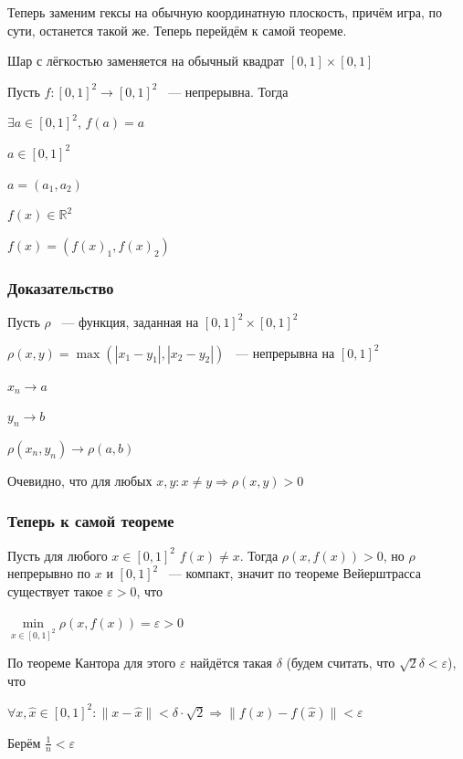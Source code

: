 \documentclass{article}
\begin{document}
			Теперь заменим гексы на обычную координатную плоскость, причём игра, по сути, останется такой же. Теперь перейдём к самой теореме.
			
			Шар с лёгкостью заменяется на обычный квадрат $[0, 1] \times [0, 1]$
			
			Пусть $f : [0, 1]^2 \rightarrow [0, 1]^2$ ~--- непрерывна. Тогда
			
			$\exists a \in [0, 1]^2$, $f(a) = a$
			
			$a \in [0, 1]^2$
			
			$a = (a_1, a_2)$
			
			$f(x) \in \mathbb{R}^2$
			
			$f(x) = (f(x)_1, f(x)_2)$
			
        \subsubsection{Доказательство}
			
			Пусть $\rho$ ~--- функция, заданная на $[0, 1]^2 \times [0, 1]^2$
				
			$\rho(x, y) = \max \left(|x_1 - y_1|, |x_2 - y_2|\right)$ ~--- непрерывна на $[0, 1]^2$
			
			$x_n \rightarrow a$
				
			$y_n \rightarrow b$
				
			$\rho(x_n, y_n) \rightarrow \rho(a, b)$
				
			Очевидно, что для любых $x, y: x \neq y \Rightarrow \rho(x, y) > 0$
				
		\subsubsection{Теперь к самой теореме}
				
            Пусть для любого $x \in [0, 1]^2$ $f(x) \neq x$. Тогда $\rho(x, f(x)) > 0$, но $\rho$ непрерывно по $x$ и $[0, 1]^2$ ~--- компакт, значит по теореме Вейерштрасса существует такое $\varepsilon > 0$, что
				
			$\min\limits_{x \in [0, 1]^2} \rho(x, f(x)) = \varepsilon > 0$
				
			По теореме Кантора для этого $\varepsilon$ найдётся такая $\delta$ (будем считать, что $\sqrt{2} \delta < \varepsilon$), что
				
			$\forall x, \widehat{x} \in [0, 1]^2 : \| x - \widehat{x} \| < \delta \cdot \sqrt{2} \Rightarrow \| f(x) - f(\widehat{x}) \| < \varepsilon$
				
			Берём $\frac{1}{n} < \varepsilon$
				
\end{document}
